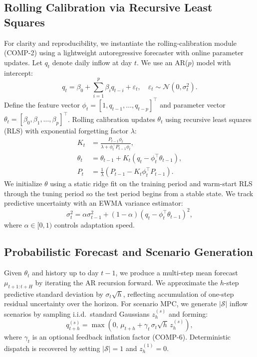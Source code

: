 \documentclass[conference]{IEEEtran}
\begin{document}
\subsection{Rolling Calibration via Recursive Least Squares}
For clarity and reproducibility, we instantiate the rolling-calibration module (COMP-2) using
a lightweight autoregressive forecaster with online parameter updates. Let $q_t$ denote daily
inflow at day $t$. We use an AR($p$) model with intercept:
\begin{equation}
q_t = \beta_0 + \sum_{i=1}^{p} \beta_i q_{t-i} + \varepsilon_t, \quad \varepsilon_t \sim \mathcal{N}(0,\sigma_t^2).
\end{equation}
Define the feature vector $\phi_t = [1, q_{t-1}, \dots, q_{t-p}]^\top$ and parameter vector
$\theta_t = [\beta_0, \beta_1, \dots, \beta_p]^\top$. Rolling calibration updates $\theta_t$
using recursive least squares (RLS) with exponential forgetting factor $\lambda$:
\begin{align}
K_t &= \frac{P_{t-1}\phi_t}{\lambda + \phi_t^\top P_{t-1}\phi_t}, \\
\theta_t &= \theta_{t-1} + K_t\left(q_t - \phi_t^\top\theta_{t-1}\right), \\
P_t &= \frac{1}{\lambda}\left(P_{t-1} - K_t\phi_t^\top P_{t-1}\right).
\end{align}
We initialize $\theta$ using a static ridge fit on the training period and warm-start RLS
through the tuning period so the test period begins from a stable state.
We track predictive uncertainty with an EWMA variance estimator:
\begin{equation}
\sigma_t^2 = \alpha\sigma_{t-1}^2 + (1-\alpha)\left(q_t - \phi_t^\top\theta_{t-1}\right)^2,
\end{equation}
where $\alpha \in [0,1)$ controls adaptation speed.

\subsection{Probabilistic Forecast and Scenario Generation}
Given $\theta_t$ and history up to day $t{-}1$, we produce a multi-step mean forecast
$\mu_{t+1:t+H}$ by iterating the AR recursion forward.
We approximate the $h$-step predictive standard deviation by $\sigma_t\sqrt{h}$, reflecting
accumulation of one-step residual uncertainty over the horizon.
For scenario MPC, we generate $|\mathcal{S}|$ inflow scenarios by sampling i.i.d.\ standard
Gaussians $z^{(s)}_h$ and forming:
\begin{equation}
q^{(s)}_{t+h} = \max\left(0,\,\mu_{t+h} + \gamma_t\,\sigma_t\sqrt{h}\,z^{(s)}_h\right),
\end{equation}
where $\gamma_t$ is an optional feedback inflation factor (COMP-6). Deterministic dispatch is
recovered by setting $|\mathcal{S}|{=}1$ and $z^{(1)}_h{=}0$.
\end{document}
